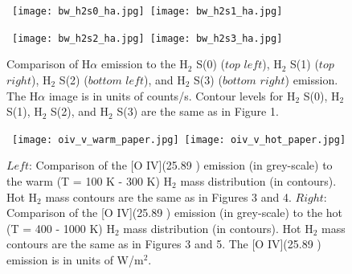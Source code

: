 \documentclass[manuscript]{aastex}
\begin{document}
\clearpage

\begin{figure}[!h]
\centerline{\hbox{ \hspace{0.0in} 
\texttt{[image: bw\_h2s0\_ha.jpg]}
\hspace{0.1in}
\texttt{[image: bw\_h2s1\_ha.jpg]}}}
\end{figure}

\begin{figure}[!h]
\centerline{\hbox{\hspace{0.0in}
\texttt{[image: bw\_h2s2\_ha.jpg]}
\hspace{0.1in}
\texttt{[image: bw\_h2s3\_ha.jpg]}}}
\caption{Comparison of H$\alpha$ emission to the $\mathrm{H_2}$ S(0) ($top$ $left$),  $\mathrm{H_2}$ S(1) ($top$ $right$),  $\mathrm{H_2}$ S(2) ($bottom$ $left$),  and $\mathrm{H_2}$ S(3) ($bottom$ $right$) emission.  The H$\alpha$ image is in units of counts/s.  Contour levels for $\mathrm{H_2}$ S(0), $\mathrm{H_2}$ S(1), $\mathrm{H_2}$ S(2), and $\mathrm{H_2}$ S(3) are the same as in Figure 1.\label{fig10}}
\end{figure}

\clearpage

\begin{figure}[!h]
\centerline{\hbox{ \hspace{0.0in} 
\texttt{[image: oiv\_v\_warm\_paper.jpg]}
\hspace{0.1in}
\texttt{[image: oiv\_v\_hot\_paper.jpg]}}}
\caption{$Left$:  Comparison of the [O IV](25.89 \micron) emission (in grey-scale) to the warm (T = 100 K - 300 K) $\mathrm{H_2}$ mass distribution (in contours).  Hot $\mathrm{H_2}$ mass contours are the same as in Figures 3 and 4.  $Right$: Comparison of the [O IV](25.89 \micron) emission (in grey-scale) to the hot (T = 400 - 1000 K) $\mathrm{H_2}$ mass distribution (in contours).  Hot $\mathrm{H_2}$ mass contours are the same as in Figures 3 and 5.  The [O IV](25.89 \micron) emission is in units of W/$\mathrm{m^2}$.\label{fig11}}
\end{figure}
\end{document}
